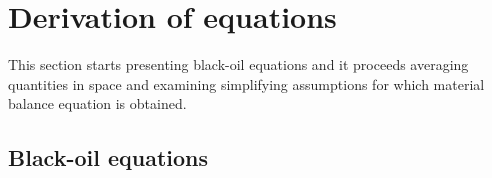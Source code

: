 \documentclass[authoryear,preprint,review,11pt]{elsarticle}
\begin{document}
%
%
%
%
%

\section{Derivation of equations}

This section starts presenting black-oil equations and it proceeds averaging quantities in space and examining simplifying assumptions for which material balance equation is obtained.

\subsection{Black-oil equations}


\end{document}
